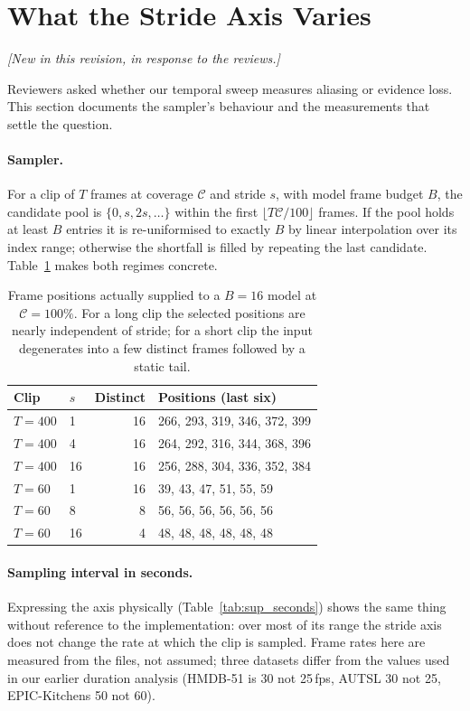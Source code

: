 \documentclass[runningheads]{llncs}
\newcommand{\tabtight}{\setlength{\tabcolsep}{3.5pt}\renewcommand{\arraystretch}{1.12}}
\newcommand{\rev}[1]{\textcolor{revblue}{#1}}
\newcommand{\revnote}{\noindent\textcolor{revblue}{\small\itshape
  [New in this revision, in response to the reviews.]}\par\vspace{2pt}}
\begin{document}
\section{\rev{What the Stride Axis Varies}}
\revnote
\color{revblue}
\label{sec:sup_padding}

Reviewers asked whether our temporal sweep measures aliasing or evidence loss.
This section documents the sampler's behaviour and the measurements that settle
the question.

\paragraph{Sampler.} For a clip of $T$ frames at coverage $\mathcal{C}$ and
stride $s$, with model frame budget $B$, the candidate pool is
$\{0,s,2s,\dots\}$ within the first $\lfloor T\mathcal{C}/100\rfloor$ frames.
If the pool holds at least $B$ entries it is re-uniformised to exactly $B$ by
linear interpolation over its index range; otherwise the shortfall is filled by
repeating the last candidate. Table~\ref{tab:sup_indices} makes both regimes
concrete.

\begin{table}[!htbp]
\centering
\caption{Frame positions actually supplied to a $B{=}16$ model at
$\mathcal{C}{=}100\%$. For a long clip the selected positions are nearly
independent of stride; for a short clip the input degenerates into a few
distinct frames followed by a static tail.}
\label{tab:sup_indices}
\scriptsize\tabtight
\begin{tabular}{l l r l}
\toprule
Clip & $s$ & Distinct & Positions (last six) \\
\midrule
$T{=}400$ & 1  & 16 & 266, 293, 319, 346, 372, 399 \\
$T{=}400$ & 4  & 16 & 264, 292, 316, 344, 368, 396 \\
$T{=}400$ & 16 & 16 & 256, 288, 304, 336, 352, 384 \\
\midrule
$T{=}60$  & 1  & 16 & 39, 43, 47, 51, 55, 59 \\
$T{=}60$  & 8  &  8 & 56, 56, 56, 56, 56, 56 \\
$T{=}60$  & 16 &  4 & 48, 48, 48, 48, 48, 48 \\
\bottomrule
\end{tabular}
\end{table}

\paragraph{Sampling interval in seconds.} Expressing the axis physically
(Table~\ref{tab:sup_seconds}) shows the same thing without reference to the
implementation: over most of its range the stride axis does not change the rate
at which the clip is sampled. Frame rates here are measured from the files, not
assumed; three datasets differ from the values used in our earlier duration
analysis (HMDB-51 is 30 not 25\,fps, AUTSL 30 not 25, EPIC-Kitchens 50 not 60).
\end{document}
